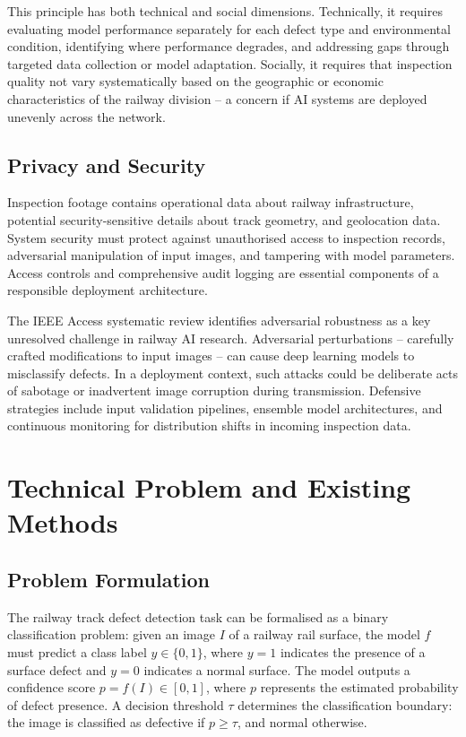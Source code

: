 \documentclass[conference]{IEEE}
\begin{document}
This principle has both technical and social dimensions. Technically, it requires evaluating model performance separately for each defect type and environmental condition, identifying where performance degrades, and addressing gaps through targeted data collection or model adaptation. Socially, it requires that inspection quality not vary systematically based on the geographic or economic characteristics of the railway division -- a concern if AI systems are deployed unevenly across the network.

\subsection{Privacy and Security}

Inspection footage contains operational data about railway infrastructure, potential security-sensitive details about track geometry, and geolocation data. System security must protect against unauthorised access to inspection records, adversarial manipulation of input images, and tampering with model parameters. Access controls and comprehensive audit logging are essential components of a responsible deployment architecture.

The IEEE Access systematic review \cite{ieee2025} identifies adversarial robustness as a key unresolved challenge in railway AI research. Adversarial perturbations -- carefully crafted modifications to input images -- can cause deep learning models to misclassify defects. In a deployment context, such attacks could be deliberate acts of sabotage or inadvertent image corruption during transmission. Defensive strategies include input validation pipelines, ensemble model architectures, and continuous monitoring for distribution shifts in incoming inspection data.

\section{Technical Problem and Existing Methods}
\label{sec:technical}

\subsection{Problem Formulation}

The railway track defect detection task can be formalised as a binary classification problem: given an image $I$ of a railway rail surface, the model $f$ must predict a class label $y \in \{0, 1\}$, where $y = 1$ indicates the presence of a surface defect and $y = 0$ indicates a normal surface. The model outputs a confidence score $p = f(I) \in [0, 1]$, where $p$ represents the estimated probability of defect presence. A decision threshold $\tau$ determines the classification boundary: the image is classified as defective if $p \geq \tau$, and normal otherwise.
\end{document}
